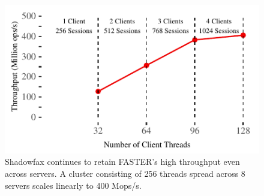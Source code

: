\begin{figure}[t]
\centering
\includegraphics[width=0.9\columnwidth]{graphs/cloudLab.pdf}
\caption{Shadowfax continues to retain FASTER’s
    high throughput even across servers. A cluster consisting of 256
    threads spread across 8 servers scales linearly to 400 Mops/s.
}
\label{fig:system-scalability}
\end{figure}
